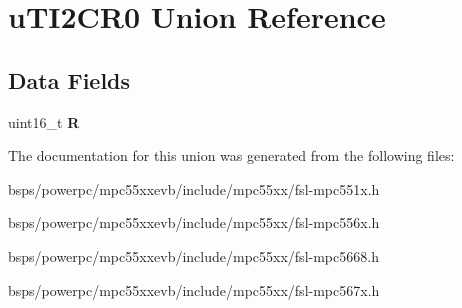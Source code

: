 \hypertarget{unionuTI2CR0}{}\section{u\+T\+I2\+C\+R0 Union Reference}
\label{unionuTI2CR0}
\subsection*{Data Fields}
\begin{DoxyCompactItemize}
\item 
\mbox{\label{unionuTI2CR0_a4614b7c69e7f4efe7797b0f192d93ae0}} 
uint16\+\_\+t {\bfseries R}
\end{DoxyCompactItemize}


The documentation for this union was generated from the following files\+:\begin{DoxyCompactItemize}
\item 
bsps/powerpc/mpc55xxevb/include/mpc55xx/fsl-\/mpc551x.\+h\item 
bsps/powerpc/mpc55xxevb/include/mpc55xx/fsl-\/mpc556x.\+h\item 
bsps/powerpc/mpc55xxevb/include/mpc55xx/fsl-\/mpc5668.\+h\item 
bsps/powerpc/mpc55xxevb/include/mpc55xx/fsl-\/mpc567x.\+h\end{DoxyCompactItemize}
